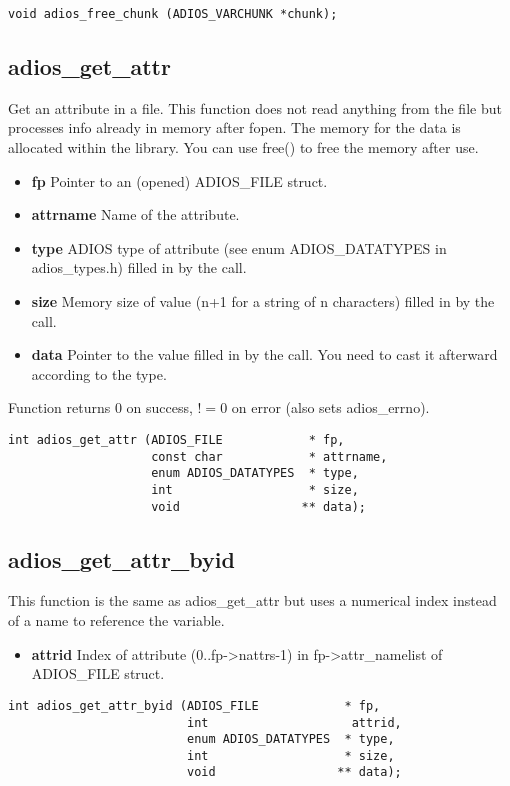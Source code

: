 \begin{lstlisting}[alsolanguage=C]
void adios_free_chunk (ADIOS_VARCHUNK *chunk);
\end{lstlisting}



\subsection{adios\_get\_attr}
Get an attribute in a file.
This function does not read anything from the file but processes info
already in memory after fopen.
The memory for the data is allocated within the library.
You can use free() to free the memory after use.

\begin{itemize}
\item{\bf fp}       Pointer to an (opened) ADIOS\_FILE struct.
\item{\bf attrname} Name of the attribute.
\item{\bf type}    ADIOS type of attribute (see enum ADIOS\_DATATYPES in adios\_types.h) filled in by the call. 
\item{\bf size}     Memory size of value (n+1 for a string of n characters) filled in by the call. 
\item{\bf data}    Pointer to the value filled in by the call. You need to cast it afterward according to the type.
\end{itemize}

Function returns 0 on success, $!=0$ on error (also sets adios\_errno).

\begin{lstlisting}[alsolanguage=C]
int adios_get_attr (ADIOS_FILE            * fp,
                    const char            * attrname,
                    enum ADIOS_DATATYPES  * type,
                    int                   * size,
                    void                 ** data);

\end{lstlisting}



\subsection{adios\_get\_attr\_byid}
This function is the same as adios\_get\_attr but uses a numerical index instead of a name to reference the variable. 
\begin{itemize}
\item{\bf attrid} Index of attribute (0..fp->nattrs-1) in fp->attr\_namelist of ADIOS\_FILE struct. 
\end{itemize}
\begin{lstlisting}[alsolanguage=C]
int adios_get_attr_byid (ADIOS_FILE            * fp, 
                         int                    attrid,  
                         enum ADIOS_DATATYPES  * type,
                         int                   * size, 
                         void                 ** data);
\end{lstlisting}



